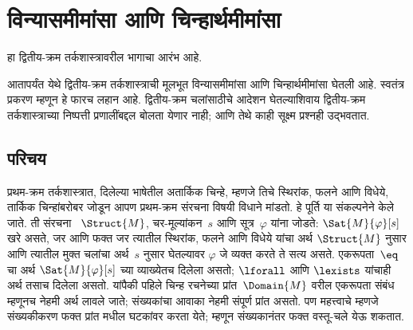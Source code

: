 \chapter{विन्यासमीमांसा आणि चिन्हार्थमीमांसा}\label{sol:syn:chap}
\begin{editorial}
हा द्वितीय-क्रम
तर्कशास्त्रावरील
भागाचा आरंभ आहे.
\end{editorial}
\begin{editorial}
आतापर्यंत येथे
द्वितीय-क्रम
तर्कशास्त्राची
मूलभूत विन्यासमीमांसा
आणि चिन्हार्थमीमांसा
घेतली आहे.
स्वतंत्र प्रकरण
म्हणून हे फारच
लहान आहे.
द्वितीय-क्रम
चलांसाठीचे आदेशन
घेतल्याशिवाय
द्वितीय-क्रम
तर्कशास्त्राच्या
निष्पत्ती प्रणालींबद्दल
बोलता येणार नाही;
आणि तेथे काही
सूक्ष्म प्रश्नही
उद्भवतात.
\end{editorial}









\section{परिचय}\label{sol:syn:int:sec}

प्रथम-क्रम तर्कशास्त्रात,
दिलेल्या भाषेतील
अतार्किक चिन्हे,
म्हणजे तिचे
स्थिरांक,
फलने
आणि विधेये,
तार्किक चिन्हांबरोबर
जोडून आपण
प्रथम-क्रम
संरचना
विषयी विधाने
मांडतो.
हे पूर्ति
या संकल्पनेने
केले जाते.
ती संरचना~
$\Struct{M}$,
चर-मूल्यांकन~$s$
आणि सूत्र~$\varphi$
यांना जोडते:
$\Sat{M}{\varphi}[s]$
खरे असते, जर
आणि फक्त जर
त्यातील
स्थिरांक,
फलने
आणि विधेये
यांचा अर्थ
$\Struct{M}$ नुसार
आणि त्यातील मुक्त
चलांचा अर्थ~$s$
नुसार घेतल्यावर
$\varphi$ जे व्यक्त
करते ते सत्य
असते.
एकरूपता~$\eq$
चा अर्थ
$\Sat{M}{\varphi}[s]$
च्या व्याख्येतच
दिलेला असतो;
$\lforall$ आणि
$\lexists$ यांचाही
अर्थ तसाच
दिलेला असतो.
यांपैकी पहिले
चिन्ह रचनेच्या
प्रांत~$\Domain{M}$
वरील एकरूपता
संबंध म्हणूनच
नेहमी अर्थ लावले
जाते; संख्यकांचा
आवाका नेहमी
संपूर्ण प्रांत
असतो.
पण महत्त्वाचे
म्हणजे संख्यकीकरण
फक्त प्रांत
मधील घटकांवर
करता येते;
म्हणून संख्यकानंतर
फक्त वस्तू-चले
येऊ शकतात.

